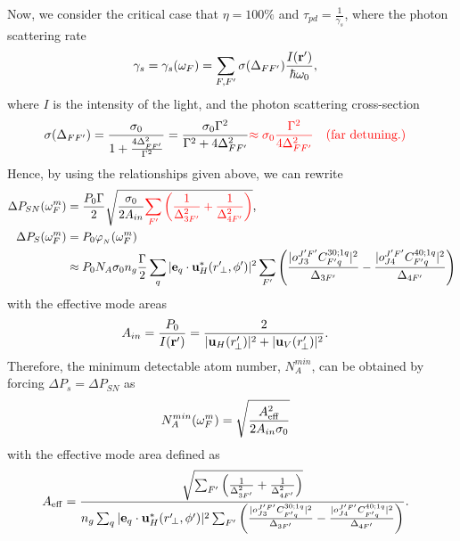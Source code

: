 \documentclass[preprint,aps,pra,onecolumn]{revtex4-1} %
\begin{document}
Now, we consider the critical case that $\eta =100\%$ and $\tau_{pd} = \frac{1}{\gamma_s}$, where the 
photon scattering rate
\begin{align}
\gamma_s &=\gamma_s (\omega_F)= \sum_{F,F'}\sigma(\Delta_{FF'}) \frac{I(\mathbf{r}')}{\hbar \omega_0}, 
\end{align}
where $ I $ is the intensity of the light, and the photon scattering cross-section
\begin{align}
\sigma(\Delta_{FF'}) &=\frac{\sigma_0}{1+\frac{4\Delta^2_{FF'}}{\Gamma^2}}=\frac{\sigma_0\Gamma^2}{\Gamma^2+4\Delta^2_{FF'}} \mathbin{\color{red} \approx \sigma_0 
\frac{\Gamma^2}{4\Delta^2_{FF'}} \quad \text{(far detuning.)}}
\end{align}
Hence, by using the relationships given above, we can rewrite 
\begin{align}
\Delta P_{SN} (\omega_F^m) &=\frac{P_0\Gamma}{2}\sqrt{\frac{ \sigma_0 }{2A_{in}} \mathbin{\color{red}\sum_{F'} 
\left( \frac{1}{\Delta_{3F'}^2}+\frac{1}{\Delta_{4F'}^2}\right) }},\\
\Delta P_S (\omega_F^m) &= P_0  \varphi_{_N} (\omega_F^m) \nonumber\\
&\approx  P_0 N_A 
\sigma_0 n_g\frac{\Gamma}{2} 
\sum_q 
|\mathbf{e}_q\cdot 
\mathbf{u}_H^*(r^\prime\!_\perp,\phi')|^2 
\sum_{F'}  \left( \frac{|o^{J'F'}_{J3} C^{3 0;1q}_{F' q}|^2 }{\Delta_{3F'} } - 
 \frac{|o^{J'F'}_{J4} C^{4 0;1q}_{F' q}|^2 }{\Delta_{4F'}}  \right) \\
\end{align}
with the effective mode areas
\begin{align}
A_{in } &= \frac{P_0}{I(\mathbf{r}')}=\frac{2}{| \mathbf{u}_H(r'_{\!\perp})|^2+ | 
\mathbf{u}_V(r'_{\!\perp})|^2}.
\end{align}
Therefore, the minimum detectable atom number, $ N_A^{min} $, can be obtained by forcing $ \Delta 
P_s = \Delta P_{SN} $ as
\begin{align}
N_A^{min}(\omega_F^m) &= \sqrt{\frac{A_{\rm eff}^2}{2A_{in}\sigma_0}} 
\end{align}
with the effective mode area defined as
\begin{align}
A_{\rm eff} &= \frac{ \sqrt{\sum_{F'}\left( \frac{1}{\Delta_{3F'}^2}+\frac{1}{\Delta_{4F'}^2}\right) }}{ n_g 
\sum_q |\mathbf{e}_q\cdot \mathbf{u}_H^*(r^\prime\!_\perp,\phi')|^2 
\sum_{F'}  \left( \frac{|o^{J'F'}_{J3} C^{3 0;1q}_{F' q}|^2 }{\Delta_{3F'} } - 
 \frac{|o^{J'F'}_{J4} C^{4 0;1q}_{F' q}|^2 }{\Delta_{4F'}}  \right) }.
\end{align}
\end{document}
